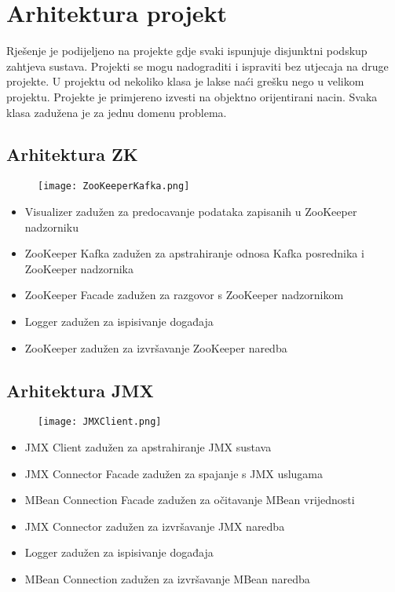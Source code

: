 \documentclass[times, utf8, diplomski, numeric]{fer}
\begin{document}
\section{Arhitektura projekt}

Rješenje je podijeljeno na projekte gdje svaki ispunjuje disjunktni podskup zahtjeva sustava. Projekti se mogu nadograditi i ispraviti bez utjecaja na druge projekte. U projektu od nekoliko klasa je lakse naći grešku nego u velikom projektu. Projekte je primjereno izvesti na objektno orijentirani nacin. Svaka klasa zadužena je za jednu domenu problema.

\subsection{Arhitektura ZK}

\begin{figure}[H]
    \centering
    \texttt{[image: ZooKeeperKafka.png]}
    \caption{}
    \label{fig:zookeeper-kafka}
\end{figure}

\begin{itemize}
    \item Visualizer zadužen za predocavanje podataka zapisanih u ZooKeeper nadzorniku
    \item ZooKeeper Kafka zadužen za apstrahiranje odnosa Kafka posrednika i ZooKeeper nadzornika
    \item ZooKeeper Facade zadužen za razgovor s ZooKeeper nadzornikom
    \item Logger zadužen za ispisivanje događaja
    \item ZooKeeper zadužen za izvršavanje ZooKeeper naredba
\end{itemize}

\subsection{Arhitektura JMX}

\begin{figure}[H]
    \centering
    \texttt{[image: JMXClient.png]}
    \caption{}
    \label{fig:jmx-client}
\end{figure}

\begin{itemize}
    \item JMX Client zadužen za apstrahiranje JMX sustava
    \item JMX Connector Facade zadužen za spajanje s JMX uslugama
    \item MBean Connection Facade zadužen za očitavanje MBean vrijednosti
    \item JMX Connector zadužen za izvršavanje JMX naredba
    \item Logger zadužen za ispisivanje događaja
    \item MBean Connection zadužen za izvršavanje MBean naredba
\end{itemize}
\end{document}

